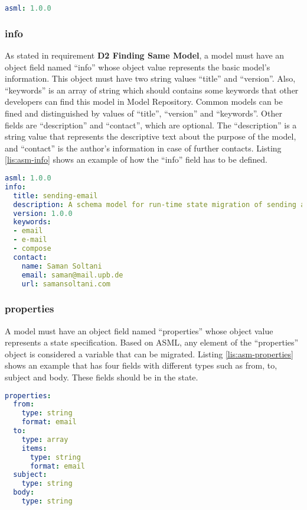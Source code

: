 \lstset{
  label=lis:asm-asml, caption=Application State Model “asml” field example., 
}
\begin{lstlisting}[language=yaml]
asml: 1.0.0
\end{lstlisting}
\subsubsection{info}
As stated in requirement \textbf{D2 Finding Same Model}, a model must have an object field named “info” whose object value represents the basic model’s information. This object must have two string values “title” and “version”. Also, “keywords” is an array of string which should contains some keywords that other developers can find this model in Model Repository. Common models can be fined and distinguished by values of “title”, “version” and “keywords”. Other fields are “description” and “contact”, which are optional. The “description” is a string value that represents the descriptive text about the purpose of the model, and “contact” is the author’s information in case of further contacts. Listing \ref{lis:asm-info} shows an example of how the “info” field has to be defined.

\lstset{
  label=lis:asm-info, caption=Application State Model “info” field example. 
}
\begin{lstlisting}[language=yaml]
asml: 1.0.0
info:
  title: sending-email
  description: A schema model for run-time state migration of sending an email
  version: 1.0.0
  keywords:
  - email
  - e-mail
  - compose  
  contact:
    name: Saman Soltani
    email: saman@mail.upb.de
    url: samansoltani.com
\end{lstlisting}

\subsubsection{properties}
A model must have an object field named “properties” whose object value represents a state specification. Based on ASML, any element of the “properties” object is considered a variable that can be migrated.
Listing \ref{lis:asm-properties} shows an example that has four fields with different types such as from, to, subject and body. These fields should be in the state.

\lstset{
  label=lis:asm-properties, caption=Application State Model “properties” field example.
}
\begin{lstlisting}[language=yaml]
properties:
  from:
    type: string
    format: email
  to:
    type: array
    items:
      type: string
      format: email
  subject:
    type: string
  body:
    type: string

\end{lstlisting}
